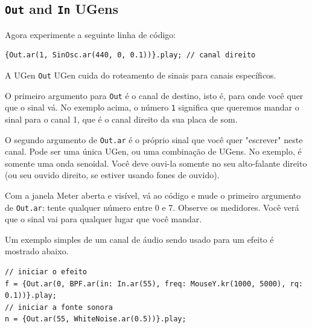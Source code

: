 \subsection{\texttt{Out} and \texttt{In} UGens}

Agora experimente a seguinte linha de código:

\begin{lstlisting}[style=SuperCollider-IDE, basicstyle=\scttfamily\footnotesize]
{Out.ar(1, SinOsc.ar(440, 0, 0.1))}.play; // canal direito
\end{lstlisting}

A UGen \texttt{Out} UGen cuida do roteamento de sinais para canais específicos.

O primeiro argumento para \texttt{Out} é o canal de destino, isto é, para onde você quer que o sinal vá. No exemplo acima, o número \texttt{1} significa que queremos mandar o sinal para o canal 1, que é o canal direito da sua placa de som.

O segundo argumento de \texttt{Out.ar} é o próprio sinal que você quer "escrever" neste canal. Pode ser uma única UGen, ou uma combinação de UGens. No exemplo, é somente uma onda senoidal. Você deve ouvi-la somente no seu alto-falante direito (ou seu ouvido direito, se estiver usando fones de ouvido).

Com a janela Meter aberta e visível, vá ao código e mude o primeiro argumento de \texttt{Out.ar}: tente qualquer número entre 0 e 7. Observe os medidores. Você verá que o sinal vai para qualquer lugar que você mandar.

\bigskip
{}
\bigskip

Um exemplo simples de um canal de áudio sendo usado para um efeito é mostrado abaixo.

\begin{lstlisting}[style=SuperCollider-IDE, basicstyle=\scttfamily\footnotesize]
// iniciar o efeito
f = {Out.ar(0, BPF.ar(in: In.ar(55), freq: MouseY.kr(1000, 5000), rq: 0.1))}.play;
// iniciar a fonte sonora
n = {Out.ar(55, WhiteNoise.ar(0.5))}.play;
\end{lstlisting}

